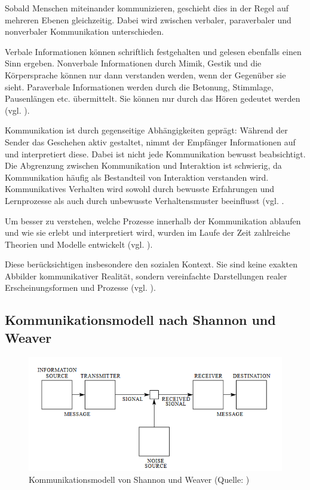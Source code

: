 Sobald Menschen miteinander kommunizieren, geschieht dies in der Regel auf mehreren Ebenen gleichzeitig. Dabei wird zwischen verbaler, paraverbaler und nonverbaler Kommunikation unterschieden. 

Verbale Informationen können schriftlich festgehalten und gelesen ebenfalls einen Sinn ergeben.
Nonverbale Informationen durch Mimik, Gestik und die Körpersprache können nur dann verstanden werden, wenn der Gegenüber sie sieht. 
Paraverbale Informationen werden durch die Betonung, Stimmlage, Pausenlängen etc. übermittelt. Sie können nur durch das Hören gedeutet werden (vgl. \citealp[S. 33]{ebert_formen_2018}).

Kommunikation ist durch gegenseitige Abhängigkeiten geprägt: Während der Sender das Geschehen aktiv gestaltet, nimmt der Empfänger Informationen auf und interpretiert diese. Dabei ist nicht jede Kommunikation bewusst beabsichtigt. Die Abgrenzung zwischen Kommunikation und Interaktion ist schwierig, da Kommunikation häufig als Bestandteil von Interaktion verstanden wird. Kommunikatives Verhalten wird sowohl durch bewusste Erfahrungen und Lernprozesse als auch durch unbewusste Verhaltensmuster beeinflusst (vgl. \citealp[S. 20]{becker_praxishandbuch_2018}.

Um besser zu verstehen, welche Prozesse innerhalb der Kommunikation ablaufen und wie sie erlebt und interpretiert wird, wurden im Laufe der Zeit zahlreiche Theorien und Modelle entwickelt (vgl. \citealp[S. 311]{schwarz_grundlagen_2019}).

Diese  berücksichtigen insbesondere den sozialen Kontext. Sie sind keine exakten Abbilder kommunikativer Realität, sondern vereinfachte Darstellungen realer Erscheinungsformen und Prozesse (vgl. \citealp[S. 56]{maletzke_kommunikationswissenschaft_1998}).

\subsection{Kommunikationsmodell nach Shannon und Weaver}

\begin{figure}[ht]
\centering
\includegraphics[width=1\linewidth]{content/pictures/shannon-weaver.PNG}
\caption{Kommunikationsmodell von Shannon und Weaver (Quelle: \citealp[S. 2]{shannon_mathematical_1948})}
\label{fig:shannon-weaver-modell}
\end{figure}

